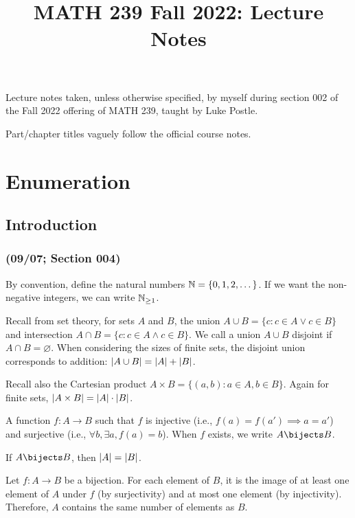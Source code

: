 \documentclass[class=math239,notes]{agony}
\title{MATH 239 Fall 2022: Lecture Notes}
\begin{document}
\renewcommand{\contentsname}{MATH 239 Fall 2022:\\{\huge Lecture Notes}}
\thispagestyle{firstpage}
\tableofcontents

Lecture notes taken, unless otherwise specified,
by myself during section 002 of the Fall 2022 offering of MATH 239,
taught by Luke Postle.

Part/chapter titles vaguely follow the official course notes.

\part{Enumeration}

\chapter{Introduction}

\section{(09/07; Section 004)}

By convention, define the natural numbers $\mathbb{N} = \{0,1,2,\dotsc\}$.
If we want the non-negative integers, we can write $\mathbb{N}_{\geq1}$.

Recall from set theory, for sets $A$ and $B$,
the union $A \cup B = \{c : c \in A \lor c \in B\}$
and intersection $A \cap B = \{c : c \in A \land c \in B\}$.
We call a union $A \cup B$ disjoint if $A \cap B = \varnothing$.
When considering the sizes of finite sets,
the disjoint union corresponds to addition:
$\abs{A \cup B} = \abs{A} + \abs{B}$.

Recall also the Cartesian product $A \times B = \{(a,b) : a \in A, b \in B\}$.
Again for finite sets, $\abs{A \times B} = \abs{A} \cdot \abs{B}$.

\begin{defn}[bijection]
  A function $f : A \to B$ such that $f$ is injective (i.e., $f(a) = f(a') \implies a = a'$)
  and surjective (i.e., $\forall b, \exists a, f(a) = b$).
  When $f$ exists, we write $A \bijects B$.
\end{defn}

\begin{theorem}
  If $A \bijects B$, then $\abs{A} = \abs{B}$.
\end{theorem}
\begin{prf}
  Let $f : A \to B$ be a bijection.
  For each element of $B$, it is the image of
  at least one element of $A$ under $f$ (by surjectivity)
  and at most one element (by injectivity).
  Therefore, $A$ contains the same number of elements as $B$.
\end{prf}
\end{document}
